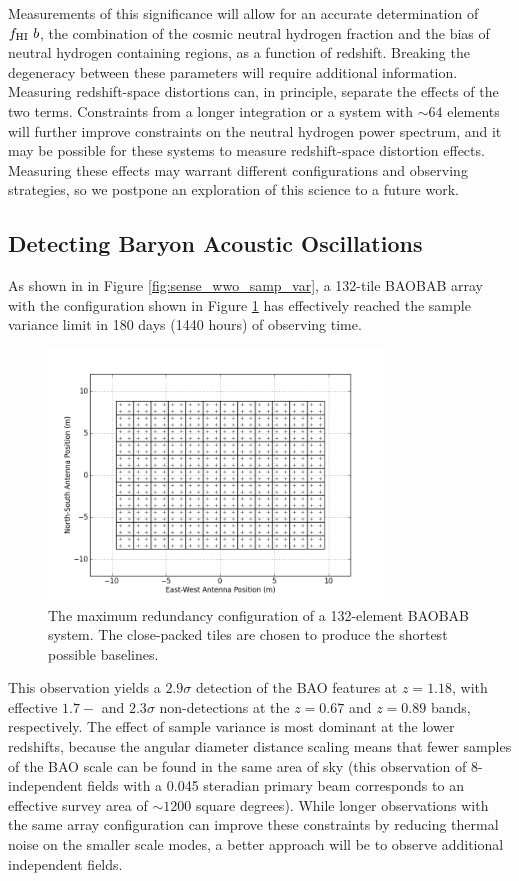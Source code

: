 \documentclass[10pt,iop]{emulateapj}
\begin{document}
Measurements of this significance will allow for an accurate determination of $f_{\rm HI}~b$, 
the combination of the cosmic neutral
hydrogen fraction and the bias of neutral hydrogen containing regions, as a function of redshift.  Breaking the degeneracy between these parameters will require
additional information.  Measuring redshift-space distortions can, in principle,
separate the effects of the two terms. 
Constraints from a longer integration or a system with $\sim 64$ elements
will further improve constraints on the neutral hydrogen power spectrum, and it may be possible
for these systems to measure redshift-space distortion effects.  Measuring these effects may
warrant different configurations and observing strategies, so we postpone an exploration of
this science to a future work.

\subsection{Detecting Baryon Acoustic Oscillations}
\label{sec:baobab128}

As shown in in Figure \ref{fig:sense_wwo_samp_var}, a 132-tile BAOBAB array with the configuration
shown in Figure \ref{fig:antpos128} has effectively reached
the sample variance limit in 180 days (1440 hours) of observing time.  
\begin{figure}\centering
\includegraphics[width=3.5in]{antpos128-2.png}
\caption{The maximum redundancy configuration of a 132-element BAOBAB system.  The close-packed
tiles are chosen to produce the shortest possible baselines.
} \label{fig:antpos128}
\end{figure}
This observation yields a $2.9\sigma$ detection of the BAO features at $z = 1.18$, 
with effective $1.7-$ and $2.3\sigma$ non-detections at the $z = 0.67$ and $z = 0.89$ bands,
respectively.
The effect of sample variance is most dominant at the lower redshifts, 
because the angular diameter distance scaling means that fewer samples of the BAO scale can be
found in the same area of sky (this observation of 8-independent fields with a
0.045 steradian primary beam corresponds to an effective survey area of $\sim 1200$ square degrees).
While longer observations with the same array configuration can improve these constraints
by reducing thermal noise on the smaller scale modes, a
better approach will be to observe additional independent fields.
\end{document}
